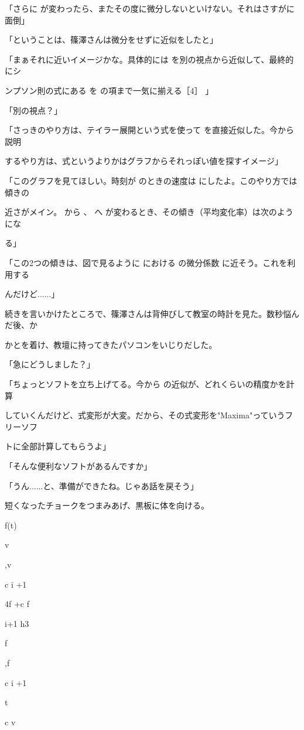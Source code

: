 「さらに が変わったら、またその度に微分しないといけない。それはさすがに⾯倒」\par
「ということは、篠澤さんは微分をせずに近似をしたと」\par
「まぁそれに近いイメージかな。具体的には を別の視点から近似して、最終的にシ\par
ンプソン則の式にある を の項まで⼀気に揃える［4］ 」\par
「別の視点？」\par
「さっきのやり⽅は、テイラー展開という式を使って を直接近似した。今から説明\par
するやり⽅は、式というよりかはグラフからそれっぽい値を探すイメージ」\par
「このグラフを⾒てほしい。時刻が のときの速度は にしたよ。このやり⽅では傾きの\par
近さがメイン。 から 、 へ が変わるとき、その傾き（平均変化率）は次のようにな\par
る」\par
「この2つの傾きは、図で⾒るように における の微分係数 に近そう。これを利⽤する\par
んだけど......」\par
続きを⾔いかけたところで、篠澤さんは背伸びして教室の時計を⾒た。数秒悩んだ後、か\par
かとを着け、教壇に持ってきたパソコンをいじりだした。\par
「急にどうしました？」\par
「ちょっとソフトを⽴ち上げてる。今から の近似が、どれくらいの精度かを計算\par
していくんだけど、式変形が⼤変。だから、その式変形を"Maxima"っていうフリーソフ\par
トに全部計算してもらうよ」\par
「そんな便利なソフトがあるんですか」\par
「うん......と、準備ができたね。じゃあ話を戻そう」\par
短くなったチョークをつまみあげ、黒板に体を向ける。\par
f(t)\par
v\par
,v\par
c i +1\par
4f  +c f\par
i+1 h3\par
f\par
,f\par
c i +1\par
t\par
c v\par
